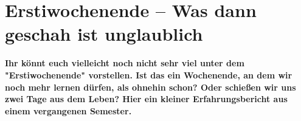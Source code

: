 \section{Erstiwochenende -- Was dann geschah ist unglaublich}
\textbf{Ihr könnt euch vielleicht noch nicht sehr viel unter dem "Erstiwochenende" vorstellen.
	Ist das ein Wochenende, an dem wir noch mehr lernen dürfen, als ohnehin schon?
	Oder schießen wir uns zwei Tage aus dem Leben?
	Hier ein kleiner Erfahrungsbericht aus einem vergangenen Semester.}

